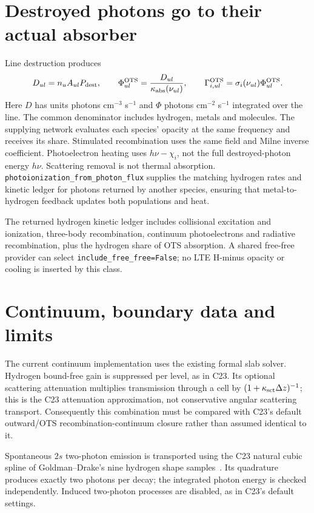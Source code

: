 \documentclass[10pt,a4paper]{article}
\begin{document}
\section{Destroyed photons go to their actual absorber}
Line destruction produces
\begin{equation}
 D_{ul}=n_uA_{ul}P_{\rm dest},\qquad
 \Phi_{ul}^{\rm OTS}=\frac{D_{ul}}{\kappa_{\rm abs}(\nu_{ul})},\qquad
 \Gamma_{i,ul}^{\rm OTS}=\sigma_i(\nu_{ul})\Phi_{ul}^{\rm OTS}.
 \label{eq:ots}
\end{equation}
Here $D$ has units photons cm$^{-3}$ s$^{-1}$ and $\Phi$ photons
cm$^{-2}$ s$^{-1}$ integrated over the line. The common denominator includes
hydrogen, metals and molecules. The supplying network evaluates each species'
opacity at the same frequency and receives its share. Stimulated recombination
uses the same field and Milne inverse coefficient. Photoelectron heating uses
$h\nu-\chi_i$, not the full destroyed-photon energy $h\nu$.
Scattering removal is not thermal absorption.
\texttt{photoionization\_from\_photon\_flux} supplies the matching hydrogen
rates and kinetic ledger for photons returned by another species, ensuring
that metal-to-hydrogen feedback updates both populations and heat.

The returned hydrogen kinetic ledger includes collisional excitation and
ionization, three-body recombination, continuum photoelectrons and radiative
recombination, plus the hydrogen share of OTS absorption. A shared free-free
provider can select \texttt{include\_free\_free=False}; no LTE H-minus opacity
or cooling is inserted by this class.

\section{Continuum, boundary data and limits}
The current continuum implementation uses the existing formal slab solver.
Hydrogen bound-free gain is suppressed per level, as in C23. Its optional
scattering attenuation multiplies transmission through a cell by
$(1+\kappa_{\rm sct}\Delta z)^{-1}$; this is the C23 attenuation approximation,
not conservative angular scattering transport. Consequently this combination
must be compared with C23's default outward/OTS recombination-continuum
closure rather than assumed identical to it.

Spontaneous $2s$ two-photon emission is transported using the C23 natural cubic
spline of Goldman--Drake's nine hydrogen shape samples~\cite{goldman}.
Its quadrature produces exactly two photons per decay; the integrated photon
energy is checked independently. Induced two-photon processes are disabled,
as in C23's default settings.
\end{document}

